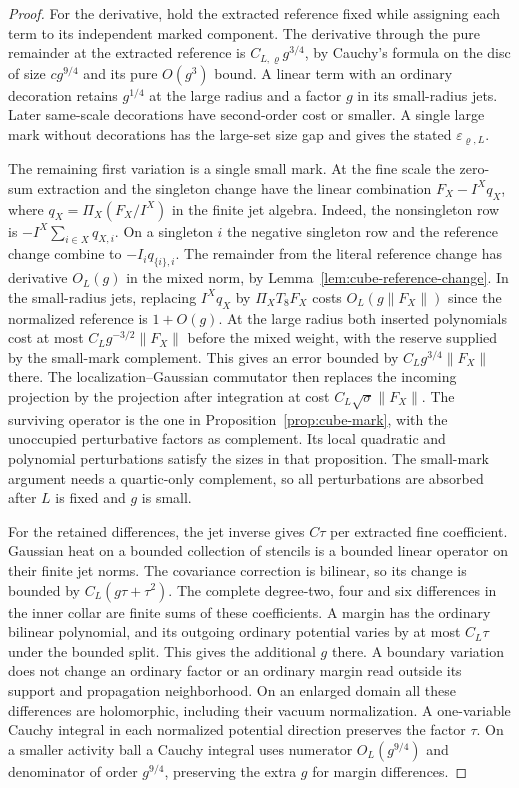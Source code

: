 \documentclass[11pt]{article}
\theoremstyle{definition}
\begin{document}
\begin{proof}
For the derivative, hold the extracted reference fixed
while assigning each term to its independent marked
component. The derivative through the pure remainder at
the extracted reference is \(C_{L,\varrho}g^{3/4}\), by
Cauchy's formula on the disc of size \(c g^{9/4}\) and its
pure \(O(g^3)\) bound. A linear term with an ordinary
decoration retains \(g^{1/4}\) at the large radius and a
factor \(g\) in its small-radius jets. Later same-scale
decorations have second-order cost or smaller. A single
large mark without decorations has the large-set size
gap and gives the stated \(\varepsilon_{\varrho,L}\).

The remaining first variation is a single small mark.
At the fine scale the zero-sum extraction and the
singleton change have the linear combination
\(F_X-I^Xq_X\), where \(q_X=\Pi_X(F_X/I^X)\) in the
finite jet algebra. Indeed, the nonsingleton row is
\(-I^X\sum_{i\in X}q_{X,i}\). On a singleton \(i\) the
negative singleton row and the reference change combine
to \(-I_i q_{\{i\},i}\). The remainder from the literal
reference change has derivative \(O_L(g)\) in the mixed
norm, by Lemma~\ref{lem:cube-reference-change}. In the
small-radius jets, replacing \(I^Xq_X\) by \(\Pi_XT_8F_X\)
costs \(O_L(g\|F_X\|)\) since the normalized reference
is \(1+O(g)\). At the large radius both inserted
polynomials cost at most \(C_Lg^{-3/2}\|F_X\|\) before
the mixed weight, with the reserve supplied by the
small-mark complement. This gives an error bounded by
\(C_Lg^{3/4}\|F_X\|\) there. The localization--Gaussian
commutator then replaces the incoming projection by the
projection after integration at cost
\(C_L\sqrt{\sigma}\|F_X\|\). The surviving operator is
the one in Proposition~\ref{prop:cube-mark}, with the
unoccupied perturbative factors as complement. Its local
quadratic and polynomial perturbations satisfy the sizes
in that proposition. The small-mark argument needs a
quartic-only complement, so all perturbations are
absorbed after \(L\) is fixed and \(g\) is small.

For the retained differences, the jet inverse gives
\(C\tau\) per extracted fine coefficient. Gaussian heat
on a bounded collection of stencils is a bounded linear
operator on their finite jet norms. The covariance
correction is bilinear, so its change is bounded by
\(C_L(g\tau+\tau^2)\). The complete degree-two, four and
six differences in the inner collar are finite sums
of these coefficients. A margin has the ordinary
bilinear polynomial, and its outgoing ordinary potential
varies by at most \(C_L\tau\) under the bounded split.
This gives the additional \(g\) there. A boundary
variation does not change an ordinary factor or an
ordinary margin read outside its support and
propagation neighborhood. On an enlarged domain all
these differences are holomorphic, including their
vacuum normalization. A one-variable Cauchy integral
in each normalized potential direction preserves the
factor \(\tau\). On a smaller activity ball a Cauchy
integral uses numerator \(O_L(g^{9/4})\) and denominator
of order \(g^{9/4}\), preserving the extra \(g\) for
margin differences.


\end{proof}
\end{document}
